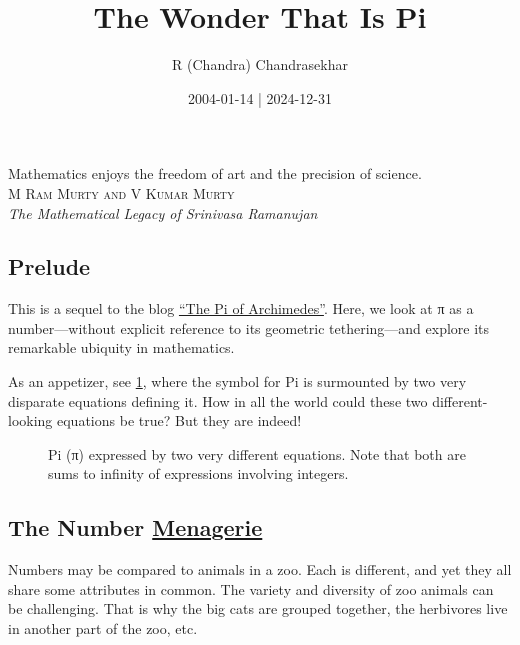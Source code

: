 \documentclass[
  a4paper,
]{article}
\title{The Wonder That Is Pi}
\author{R (Chandra) Chandrasekhar}
\date{2004-01-14 | 2024-12-31}
\begin{document}
\maketitle

\thispagestyle{empty}


\begin{flushright}

\begin{footnotesize}

Mathematics enjoys the freedom of art and the precision of science.\\
\textsc{M Ram Murty and V Kumar Murty}\\
{\textit{The Mathematical Legacy of Srinivasa Ramanujan}}

\end{footnotesize}

\end{flushright}

\subsection{Prelude}\label{prelude}

This is a sequel to the blog
\href{https://swanlotus.netlify.app/blogs/the-pi-of-archimedes}{``The Pi
of Archimedes''}. Here, we look at π as a number---without explicit
reference to its geometric tethering---and explore its remarkable
ubiquity in mathematics.

As an appetizer, see \cref{fig:pi-equations}, where the symbol for Pi is
surmounted by two very disparate equations defining it. How in all the
world could these two different-looking equations be true? But they are
indeed!

\begin{figure}
\centering

\caption{Pi (π) expressed by two very different equations. Note that
both are sums to infinity of expressions involving
integers.}\label{fig:pi-equations}
\end{figure}

\subsection{\texorpdfstring{The Number
\href{https://www.thefreedictionary.com/menagerie}{Menagerie}}{The Number Menagerie}}\label{the-number-menagerie}

Numbers may be compared to animals in a zoo. Each is different, and yet
they all share some attributes in common. The variety and diversity of
zoo animals can be challenging. That is why the big cats are grouped
together, the herbivores live in another part of the zoo, etc.
\end{document}
